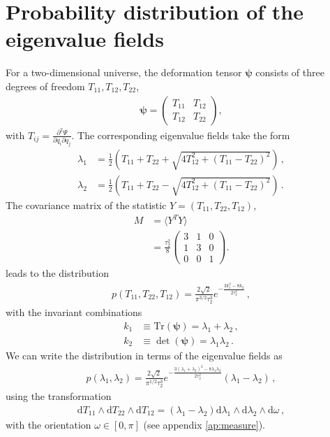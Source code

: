 \documentclass[a4paper, 11pt]{article}
\begin{document}
\section{Probability distribution of the eigenvalue fields}\label{ap:Doreskevish}
For a two-dimensional universe, the deformation tensor $\bm{\psi}$ consists of three degrees of freedom $T_{11},T_{12},T_{22}$,
\begin{align}
\bm{\psi} = 
\begin{pmatrix}
T_{11} & T_{12}\\ T_{12} & T_{22}
\end{pmatrix},
\end{align}
with $T_{ij}=\frac{\partial^2 \Psi}{\partial q_i \partial q_j}$.
The corresponding eigenvalue fields take the form
\begin{align}
\lambda_1 &= \frac{1}{2}\left( T_{11}+T_{22} + \sqrt{4T_{12}^2+ (T_{11}-T_{22})^2}\right)\,,\\
\lambda_2 &= \frac{1}{2}\left( T_{11}+T_{22} - \sqrt{4T_{12}^2+ (T_{11}-T_{22})^2}\right)\,.
\end{align}
The covariance matrix of the statistic $Y=(T_{11},T_{22},T_{12})$, 
\begin{align}
M &= \langle Y^T Y \rangle \\
&=
\frac{\tau_2^2}{8}
\begin{pmatrix}
3 & 1  & 0 \\
1 & 3 & 0 \\
0 & 0 & 1
\end{pmatrix}.
\end{align}
leads to the distribution
\begin{align}
p(T_{11},T_{22},T_{12}) = \frac{2\sqrt{2}}{\pi^{3/2}\tau_2^3} e^{-\frac{3k_1^2 - 8 k_2}{2 \tau_2^2}}\,,
\end{align}
with the invariant combinations 
\begin{align}
k_1 &\equiv \text{Tr}(\bm{\psi}) = \lambda_1+\lambda_2\,,\\
k_2 &\equiv \det(\bm{\psi}) = \lambda_1 \lambda_2\,.
\end{align}
We can write the distribution in terms of the eigenvalue fields as
\begin{align}
p(\lambda_1, \lambda_2) = \frac{2\sqrt{2}}{\pi^{1/2}\tau_2^3} e^{-\frac{3(\lambda_1+\lambda_2)^2 - 8 \lambda_1 \lambda_2}{2 \tau_2^2}}(\lambda_1 - \lambda_2)\,,
\end{align}
using the transformation
\begin{align}
\mathrm{d}T_{11} \wedge \mathrm{d}T_{22} \wedge \mathrm{d}T_{12} = (\lambda_1 - \lambda_2) \mathrm{d}\lambda_1 \wedge \mathrm{d}\lambda_2 \wedge \mathrm{d}\omega\,,
\end{align}
with the orientation $\omega \in [0,\pi]$ (see appendix \ref{ap:measure}). 
\end{document}
